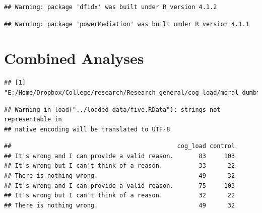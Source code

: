 \documentclass[
  american,
  man,floatsintext]{apa7}
\begin{document}
\begin{verbatim}
## Warning: package 'dfidx' was built under R version 4.1.2
\end{verbatim}

\begin{verbatim}
## Warning: package 'powerMediation' was built under R version 4.1.1
\end{verbatim}

\hypertarget{combined-analyses}{%
\section{Combined Analyses}\label{combined-analyses}}

\begin{verbatim}
## [1] "E:/Home/Dropbox/College/research/Research_general/cog_load/moral_dumbfounding_and_cognitive_load/manuscript_prep"
\end{verbatim}

\begin{verbatim}
## Warning in load("../loaded_data/five.RData"): strings not representable in
## native encoding will be translated to UTF-8
\end{verbatim}

\begin{verbatim}
##                                              cog_load control
## It's wrong and I can provide a valid reason.       83     103
## It's wrong but I can't think of a reason.          33      22
## There is nothing wrong.                            49      32
## It's wrong and I can provide a valid reason.       75     103
## It's wrong but I can't think of a reason.          32      22
## There is nothing wrong.                            49      32
\end{verbatim}
\end{document}
